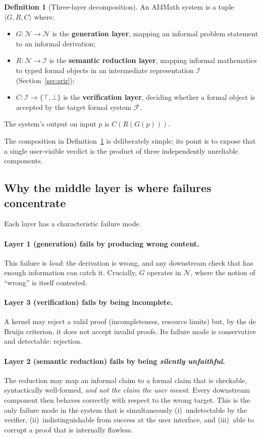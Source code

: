 \documentclass[11pt,a4paper]{article}
\theoremstyle{definition}
\newtheorem{definition}{Definition}[section]
\theoremstyle{plain}
\theoremstyle{remark}
\newcommand{\NL}{\mathcal{N}}          %
\newcommand{\IR}{\mathcal{I}}          %
\newcommand{\FS}{\mathcal{F}}          %
\begin{document}
\begin{definition}[Three-layer decomposition]
\label{def:layers}
An AI4Math system is a tuple $\langle G, R, C \rangle$ where:
\begin{itemize}
  \item $G:\NL \to \NL$ is the \textbf{generation layer}, mapping an informal
        problem statement to an informal derivation;
  \item $R:\NL \to \IR$ is the \textbf{semantic reduction layer}, mapping
        informal mathematics to typed formal objects in an intermediate
        representation $\IR$ (Section~\ref{sec:srir});
  \item $C:\IR \to \{\top,\bot\}$ is the \textbf{verification layer},
        deciding whether a formal object is accepted by the target formal
        system $\FS$.
\end{itemize}
The system's output on input $p$ is $C(R(G(p)))$.
\end{definition}

The composition in Definition~\ref{def:layers} is deliberately simple; its
point is to expose that a single user-visible verdict is the product of three
independently unreliable components.

\subsection{Why the middle layer is where failures concentrate}

Each layer has a characteristic failure mode.

\paragraph{Layer 1 (generation) fails by producing wrong content.}
This failure is \emph{loud}: the derivation is wrong, and any downstream check
that has enough information can catch it. Crucially, $G$ operates in $\NL$,
where the notion of ``wrong'' is itself contested.

\paragraph{Layer 3 (verification) fails by being incomplete.} A kernel may
reject a valid proof (incompleteness, resource limits) but, by the de Bruijn
criterion, it does not accept invalid proofs. Its failure mode is conservative
and detectable: rejection.

\paragraph{Layer 2 (semantic reduction) fails by being \emph{silently
unfaithful}.} The reduction may map an informal claim to a formal claim that is
checkable, syntactically well-formed, \emph{and not the claim the user meant}.
Every downstream component then behaves correctly with respect to the wrong
target. This is the only failure mode in the system that is simultaneously
(i)~undetectable by the verifier, (ii)~indistinguishable from success at the
user interface, and (iii)~able to corrupt a proof that is internally flawless.
\end{document}
